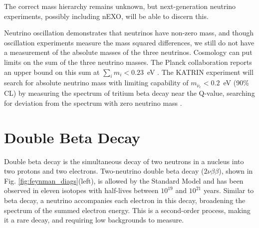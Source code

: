 \noindent
The correct mass hierarchy remains unknown, but next-generation neutrino experiments, possibly including nEXO, will be able to discern this.

Neutrino oscillation demonstrates that neutrinos have non-zero mass, and though oscillation experiments measure the mass squared differences, we still do not have a measurement of the absolute masses of the three neutrinos.  Cosmology can put limits on the sum of the three neutrino masses.  The Planck collaboration reports an upper bound on this sum at $\sum\limits_{i} m_{i} < 0.23$~eV \cite{Planck}.  The KATRIN experiment will search for absolute neutrino mass with limiting capability of $m_{\bar{\nu}_{e}} < 0.2$~eV (90\% CL) by measuring the spectrum of tritium beta decay near the Q-value, searching for deviation from the spectrum with zero neutrino mass \cite{KATRIN}.

\section{Double Beta Decay}

Double beta decay is the simultaneous decay of two neutrons in a nucleus into two protons and two electrons.  Two-neutrino double beta decay ($2\nu\beta\beta$), shown in Fig. \ref{fig:feynman_diags}(left), is allowed by the Standard Model and has been observed in eleven isotopes with half-lives between $10^{19}$ and $10^{21}$ years.  Similar to beta decay, a neutrino accompanies each electron in this decay, broadening the spectrum of the summed electron energy. This is a second-order process, making it a rare decay, and requiring low backgrounds to measure.

